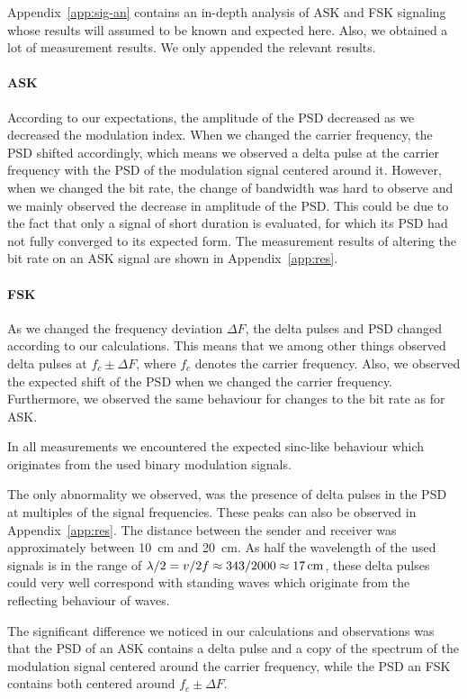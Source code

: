 \documentclass[11pt,titlepage]{report}
\begin{document}
Appendix~\ref{app:sig-an} contains an in-depth analysis of ASK and FSK signaling whose results will assumed to be known and expected here. Also, we obtained a lot of measurement results. We only appended the relevant results.

\paragraph{ASK} According to our expectations, the amplitude of the PSD decreased as we decreased the modulation index. When we changed the carrier frequency, the PSD shifted accordingly, which means we observed a delta pulse at the carrier frequency with the PSD of the modulation signal centered around it. However, when we changed the bit rate, the change of bandwidth was hard to observe and we mainly observed the decrease in amplitude of the PSD. This could be due to the fact that only a signal of short duration is evaluated, for which its PSD had not fully converged to its expected form. The measurement results of altering the bit rate on an ASK signal are shown in Appendix~\ref{app:res}.

\paragraph{FSK} As we changed the frequency deviation $\Delta F$, the delta pulses and PSD changed according to our calculations. This means that we among other things observed delta pulses at $f_c\pm \Delta F$, where $f_c$ denotes the carrier frequency. Also, we observed the expected shift of the PSD when we changed the carrier frequency. Furthermore, we observed the same behaviour for changes to the bit rate as for ASK.

In all measurements we encountered the expected sinc-like behaviour which originates from the used binary modulation signals.

The only abnormality we observed, was the presence of delta pulses in the PSD at multiples of the signal frequencies. These peaks can also be observed in Appendix~\ref{app:res}. The distance between the sender and receiver was approximately between \SI{10}{cm} and \SI{20}{cm}. As half the wavelength of the used signals is in the range of $\lambda/2=v/2f\approx 343/2000\approx\text{\SI{17}{cm}}$, these delta pulses could very well correspond with standing waves which originate from the reflecting behaviour of waves.

The significant difference we noticed in our calculations and observations was that the PSD of an ASK contains a delta pulse and a copy of the spectrum of the modulation signal centered around the carrier frequency, while the PSD an FSK contains both centered around $f_c\pm \Delta F$.
\end{document}
